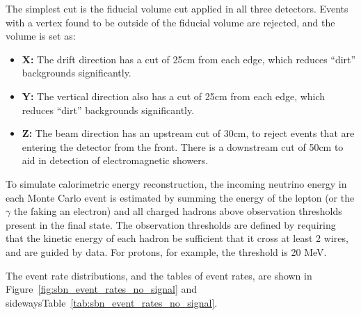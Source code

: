 The simplest cut is the fiducial volume cut applied in all three detectors.  Events with a vertex found to be outside of the fiducial volume are rejected, and the volume is set as:
\begin{itemize}
\item{\bf X:} The drift direction has a cut of 25cm from each edge, which reduces ``dirt'' backgrounds significantly.
\item{\bf Y:} The vertical direction also has a cut of 25cm from each edge, which reduces ``dirt'' backgrounds significantly.
\item{\bf Z:} The beam direction has an upstream cut of 30cm, to reject events that are entering the detector from the front.  There is a downstream cut of 50cm to aid in detection of electromagnetic showers.
\end{itemize}

To simulate calorimetric energy reconstruction, the incoming neutrino energy in each Monte Carlo event is estimated by summing the energy of the lepton (or the $\gamma$ the faking an electron) and all charged hadrons above observation thresholds present in the final state.  The observation thresholds are defined by requiring that the kinetic energy of each hadron be sufficient that it cross at least 2 wires, and are guided by \argoneut data.  For protons, for example, the threshold is 20 MeV. 

The event rate distributions, and the tables of event rates, are shown in Figure~\ref{fig:sbn_event_rates_no_signal} and sidewaysTable~\ref{tab:sbn_event_rates_no_signal}.

